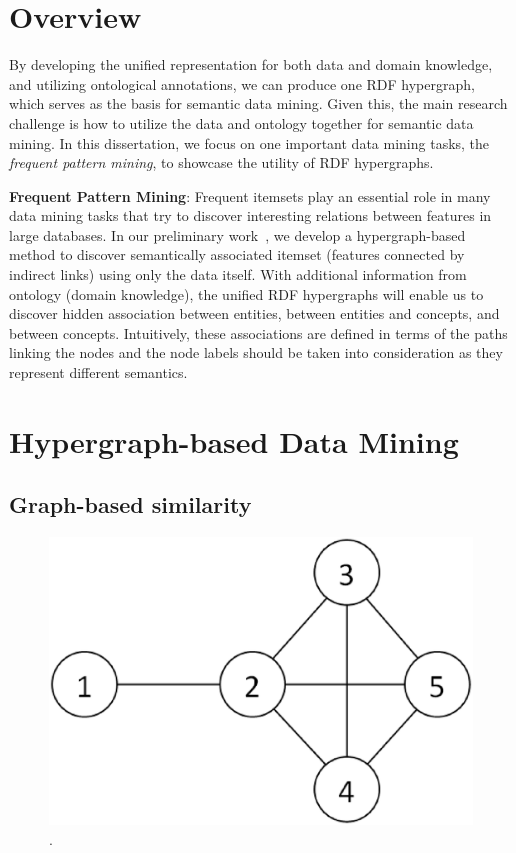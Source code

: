 \section{Overview}
By developing the unified representation for both data and domain knowledge, and utilizing ontological annotations, we can produce one RDF hypergraph, which serves as the basis for semantic data mining. Given this, the main research challenge is how to utilize the data and ontology together for semantic data mining. In this dissertation, we focus on one important data mining tasks, the {\em frequent pattern mining}, to showcase the utility of RDF hypergraphs.

\textbf{Frequent Pattern Mining}:
\label{sec:association}
Frequent itemsets play an essential role in many data mining tasks that try to discover interesting relations between features in large databases. In our preliminary work~\cite{LiuEtal11}, we develop a hypergraph-based method to discover semantically associated itemset (features connected by indirect links) using only the data itself.
With additional information from ontology (domain knowledge), the unified RDF hypergraphs will enable us to discover hidden association between entities, between entities and concepts, and between concepts. Intuitively, these associations are defined in terms of the paths linking the nodes and the node labels should be taken into consideration as they represent different semantics.

\section{Hypergraph-based Data Mining}
\subsection{Graph-based similarity}
\begin{figure}[tbh]
\centering
\includegraphics[width=.4\textwidth]{fig/comm-dist-demo.eps}
\caption{\label{fig:comm-dist-demo} .}
\end{figure}

